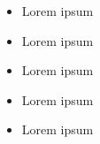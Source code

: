 \documentclass{resume_template}
\begin{document}
\begin{tcbraster}[grid]
\begin{tcolorbox}[main,raster multicolumn=4]
				\begin{itemize}
					\item Lorem ipsum
					\item Lorem ipsum
					\item Lorem ipsum
					\item Lorem ipsum
					\item Lorem ipsum
				\end{itemize}			
		\end{tcolorbox}
	\end{tcbraster}
\end{document}

